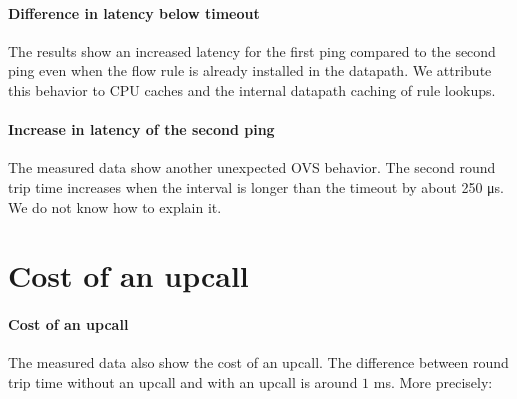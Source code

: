 \paragraph{Difference in latency below timeout}
The results show an increased latency for the first ping compared to the second ping even when the flow rule is already installed in the datapath. We attribute this behavior to CPU caches and the internal datapath caching of rule lookups. 


\paragraph{Increase in latency of the second ping} The measured data show another unexpected OVS behavior. The second round trip time increases when the interval is longer than the timeout by about 250 \si{\micro\second}. We do not know how to explain it.


\section{Cost of an upcall}
\label{res:upcall-cost}

\paragraph{Cost of an upcall}
The measured data also show the cost of an upcall. The difference between round trip time without an upcall and with an upcall is around $1$ \si{\milli\second}. More precisely:


